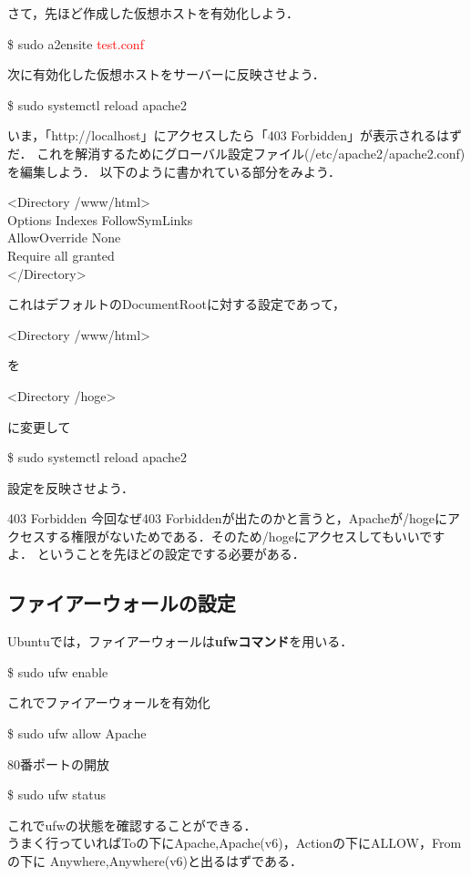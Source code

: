\documentclass[dvipdfmx,a4paper,11pt]{jsbook}
\begin{document}
さて，先ほど作成した仮想ホストを有効化しよう．
\begin{tcolorbox}[terminalbox]
  \$ sudo a2ensite \textcolor{red}{test.conf}
\end{tcolorbox}
次に有効化した仮想ホストをサーバーに反映させよう．
\begin{tcolorbox}[terminalbox]
  \$ sudo systemctl reload apache2
\end{tcolorbox}
いま，「http://localhost」にアクセスしたら「403 Forbidden」が表示されるはずだ．
これを解消するためにグローバル設定ファイル(/etc/apache2/apache2.conf)
を編集しよう．
以下のように書かれている部分をみよう．
\begin{tcolorbox}[terminalbox]
  <Directory /www/html>\\
  \qquad Options Indexes FollowSymLinks\\
  \qquad AllowOverride None\\
  \qquad Require all granted\\
  </Directory>
\end{tcolorbox}
これはデフォルトのDocumentRootに対する設定であって，
\begin{tcolorbox}[terminalbox]
  <Directory /www/html>
\end{tcolorbox}
を
\begin{tcolorbox}[terminalbox]
  <Directory /hoge>
\end{tcolorbox}
に変更して
\begin{tcolorbox}[terminalbox]
  \$ sudo systemctl reload apache2
\end{tcolorbox}
設定を反映させよう．
\begin{subbox}{403 Forbidden}
  今回なぜ403 Forbiddenが出たのかと言うと，Apacheが/hogeにアクセスする権限がないためである．そのため/hogeにアクセスしてもいいですよ．
  ということを先ほどの設定でする必要がある．
\end{subbox}

\subsection{ファイアーウォールの設定}
Ubuntuでは，ファイアーウォールは\textbf{ufwコマンド}を用いる．
\begin{tcolorbox}[terminalbox]
  \$ sudo ufw enable
\end{tcolorbox}
これでファイアーウォールを有効化
\begin{tcolorbox}[terminalbox]
  \$ sudo ufw allow Apache
\end{tcolorbox}
80番ポートの開放
\begin{tcolorbox}[terminalbox]
  \$ sudo ufw status
\end{tcolorbox}
これでufwの状態を確認することができる．\\
うまく行っていればToの下にApache,Apache(v6)，Actionの下にALLOW，Fromの下に
Anywhere,Anywhere(v6)と出るはずである．
\end{document}
